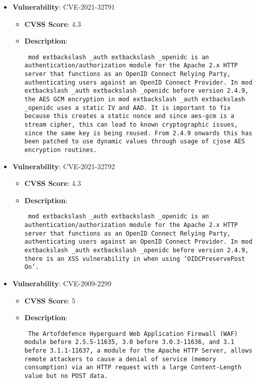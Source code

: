 \documentclass{article}
\begin{document}
\begin{itemize}
        \item \textbf{Vulnerability}: CVE-2021-32791
        \begin{itemize}
            \item \textbf{CVSS Score}:  4.3 
            \item \textbf{Description}: \parbox{\linewidth}{\texttt{ mod	extbackslash _auth	extbackslash _openidc is an authentication/authorization module for the Apache 2.x HTTP server that functions as an OpenID Connect Relying Party, authenticating users against an OpenID Connect Provider. In mod	extbackslash _auth	extbackslash _openidc before version 2.4.9, the AES GCM encryption in mod	extbackslash _auth	extbackslash _openidc uses a static IV and AAD. It is important to fix because this creates a static nonce and since aes-gcm is a stream cipher, this can lead to known cryptographic issues, since the same key is being reused. From 2.4.9 onwards this has been patched to use dynamic values through usage of cjose AES encryption routines. }}
        \end{itemize}
    
        \item \textbf{Vulnerability}: CVE-2021-32792
        \begin{itemize}
            \item \textbf{CVSS Score}:  4.3 
            \item \textbf{Description}: \parbox{\linewidth}{\texttt{ mod	extbackslash _auth	extbackslash _openidc is an authentication/authorization module for the Apache 2.x HTTP server that functions as an OpenID Connect Relying Party, authenticating users against an OpenID Connect Provider. In mod	extbackslash _auth	extbackslash _openidc before version 2.4.9, there is an XSS vulnerability in when using `OIDCPreservePost On`. }}
        \end{itemize}
    
        \item \textbf{Vulnerability}: CVE-2009-2299
        \begin{itemize}
            \item \textbf{CVSS Score}:  5 
            \item \textbf{Description}: \parbox{\linewidth}{\texttt{ The Artofdefence Hyperguard Web Application Firewall (WAF) module before 2.5.5-11635, 3.0 before 3.0.3-11636, and 3.1 before 3.1.1-11637, a module for the Apache HTTP Server, allows remote attackers to cause a denial of service (memory consumption) via an HTTP request with a large Content-Length value but no POST data. }}
        \end{itemize}
    

\end{itemize}
\end{document}
